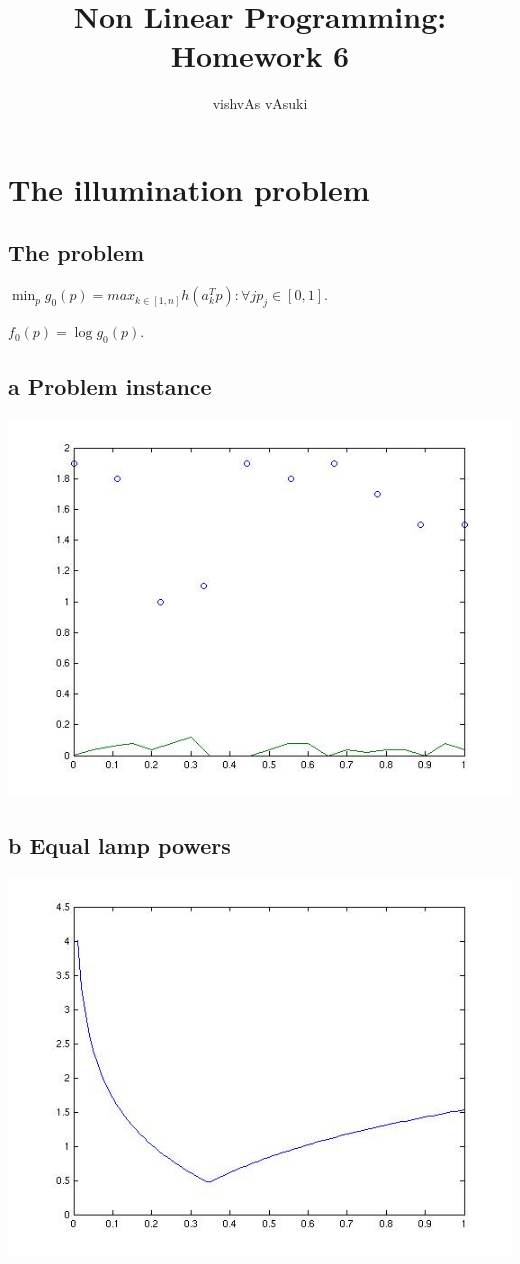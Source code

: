 \documentclass{article}
\title{Non Linear Programming: Homework 6}
\author{vishvAs vAsuki}
\begin{document}
\maketitle

\section{The illumination problem}
\subsection{The problem}
$\min_p g_0(p) = max_{k \in [1,n]} h(a_k^{T}p) : \forall j p_j \in [0,1]$.

$f_0(p) = \log g_0(p)$.

\subsection{a Problem instance}
\includegraphics[scale=.5]{code/illumdata.jpg}

\subsection{b Equal lamp powers}
\includegraphics[scale=.5]{code/equalPowers.jpg}
\end{document}
